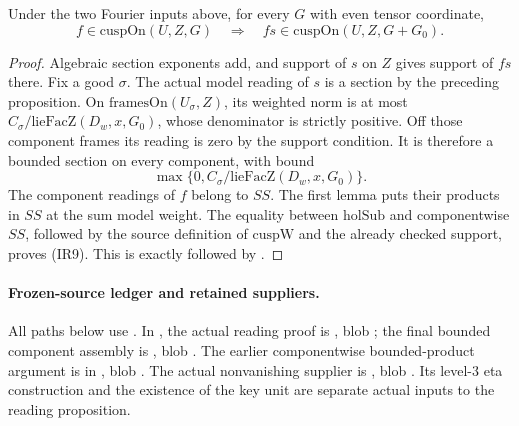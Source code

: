 \begin{srproposition}\label{prop:sr-source-component-cusp-multiplier}
Under the two Fourier inputs above, for every \(G\) with even
tensor coordinate,
\[
      f\in\mathrm{cuspOn}(U,Z,G)
          \quad\Longrightarrow\quad
      fs\in\mathrm{cuspOn}(U,Z,G+G_0).
 \tag{IR9}\label{eq:sr-source-component-cusp-product}
\]
\end{srproposition}
\begin{proof}
Algebraic section exponents add, and support of \(s\) on \(Z\)
gives support of \(fs\) there.
Fix a good \(\sigma\).
The actual model reading of \(s\) is a section by the preceding
proposition.
On \(\mathrm{framesOn}(U_\sigma,Z)\), its weighted norm is at most
\(C_\sigma/\mathrm{lieFacZ}(D_w,x,G_0)\), whose denominator is
strictly positive.
Off those component frames its reading is zero by the support
condition. It is therefore a bounded section on every component,
with bound
\[
                \max\{0,C_\sigma/\mathrm{lieFacZ}(D_w,x,G_0)\}.
\]
The component readings of \(f\) belong to \(SS\).
The first lemma puts their products in \(SS\) at the sum model
weight. The equality between \(\mathrm{holSub}\) and componentwise
\(SS\), followed by the source definition of
\(\mathrm{cuspW}\) and the already checked support, proves (IR9).
This is exactly
followed by
.
\end{proof}

\paragraph{Frozen-source ledger and retained suppliers.}
All paths below use .
In
,
the actual reading proof is
,
blob ;
the final bounded component assembly is
,
blob .
The earlier componentwise bounded-product argument is in
,
blob .
The actual nonvanishing supplier is
,
blob .
Its level-\(3\) eta construction and the existence of the key unit
are separate actual inputs to the reading proposition.

